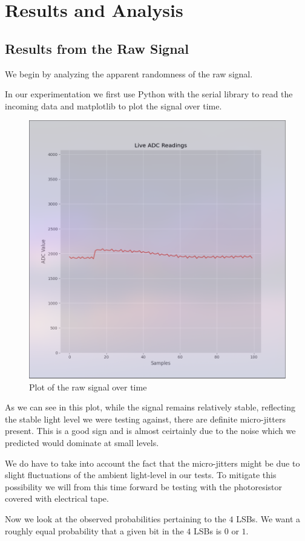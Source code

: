 \newpage
\section{Results and Analysis}
\subsection{Results from the Raw Signal}
We begin by analyzing the apparent randomness 
of the raw signal. 

In our experimentation we first use Python with the serial library 
to read the incoming data and matplotlib to plot the signal 
over time.

\begin{figure}[h]
    \centering
    \includegraphics[width=0.6\linewidth]{./images/RAW_READINGS_PLOT.png} 
    \caption{Plot of the raw signal over time}
    \label{fig:raw_signal_plot} 
\end{figure}

As we can see in this plot, while the signal remains relatively stable,
reflecting the stable light level we were testing against, 
there are definite micro-jitters present. This is a good 
sign and is almost ceirtainly due to the noise which we predicted 
would dominate at small levels.

We do have to take into account the fact that the micro-jitters 
might be due to slight fluctuations of the ambient light-level in 
our tests. To mitigate this possibility we will from this time 
forward be testing with the photoresistor covered with electrical 
tape. 

\newpage
Now we look at the observed probabilities pertaining to 
the \(4\) LSBs. We want a roughly equal probability that a given 
bit in the \(4\) LSBs is \(0\) or \(1\).


